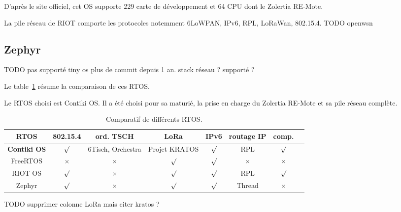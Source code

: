     D'après le site officiel, cet OS supporte 229 carte de développement et 64 CPU dont le Zolertia RE-Mote. 

    La pile réseau de RIOT comporte les protocoles notemment 6LoWPAN, IPv6, RPL, LoRaWan, 802.15.4.
    TODO openwsn

\subsection*{Zephyr}
    TODO pas supporté 
    tiny os plus de commit depuis 1 an. stack réseau ? supporté ?

Le table~\ref{tb:state-rtos-choice} résume la comparaison de ces RTOS.

Le RTOS choisi est Contiki OS. Il a été choisi pour sa maturié, la prise en charge du Zolertia RE-Mote et sa pile réseau complète.


\begin{table}[H]
    \begin{adjustbox}{width=\textwidth}
        \begin{tabular}{c||c|c|c|c|c|c|c}
            RTOS & 802.15.4 & ord. TSCH & LoRa & IPv6 & routage IP & comp. \\ \hline

            \textbf{Contiki OS} & $\surd$  & 6Tisch, Orchestra & Projet KRATOS & $\surd$ & RPL        & $\surd$ \\ \hline

            FreeRTOS            & $\times$ & $\times$          & $\surd$       & $\surd$ & $\times$   &    $\times$     \\ \hline

            RIOT OS             & $\surd$  & $\times$          & $\surd$       & $\surd$ & RPL        &    $\surd$     \\ \hline

            Zephyr              & $\surd$  & $\times$          & $\surd$       & $\surd$ & Thread     &    $\times$     \\
        \end{tabular}
    \end{adjustbox}
    \caption{Comparatif de différents RTOS.}
    \label{tb:state-rtos-choice}
\end{table}
TODO supprimer colonne LoRa mais citer kratos ? 